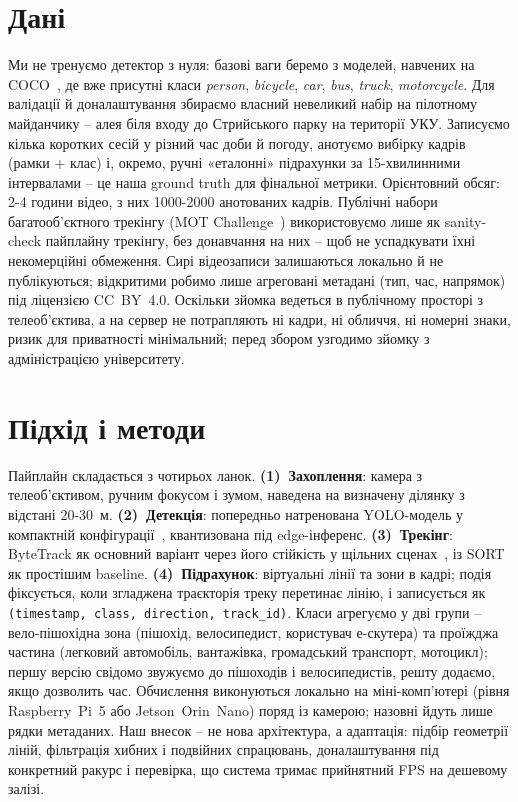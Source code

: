 \documentclass[ukrainian]{ucuproposal}
\begin{document}
\section{Дані}
Ми не тренуємо детектор з нуля: базові ваги беремо з моделей, навчених на COCO~\cite{lin2014}, де
вже присутні класи \emph{person}, \emph{bicycle}, \emph{car}, \emph{bus},
\emph{truck}, \emph{motorcycle}. Для валідації й доналаштування збираємо власний
невеликий набір на пілотному майданчику – алея біля входу до Стрийського парку на
території УКУ. Записуємо кілька коротких сесій у різний час доби й погоду, анотуємо
вибірку кадрів (рамки + клас) і, окремо, ручні «еталонні» підрахунки за
15-хвилинними інтервалами – це наша ground truth для фінальної метрики. Орієнтовний
обсяг: 2-4 години відео, з них 1000-2000 анотованих кадрів. Публічні набори
багатооб'єктного трекінгу (MOT Challenge~\cite{milan2016}) використовуємо лише як
sanity-check пайплайну трекінгу, без донавчання на них – щоб не успадкувати їхні
некомерційні обмеження. Сирі відеозаписи
залишаються локально й не публікуються; відкритими робимо лише агреговані метадані
(тип, час, напрямок) під ліцензією CC~BY~4.0. Оскільки зйомка ведеться в публічному
просторі з телеоб'єктива, а на сервер не потрапляють ні кадри, ні обличчя, ні
номерні знаки, ризик для приватності мінімальний; перед збором узгодимо зйомку з
адміністрацією університету.
\section{Підхід і методи}
Пайплайн складається з чотирьох ланок. \textbf{(1)~Захоплення}: камера з
телеоб'єктивом, ручним фокусом і зумом, наведена на визначену ділянку з відстані
20-30~м. \textbf{(2)~Детекція}: попередньо натренована YOLO-модель у компактній
конфігурації~\cite{jocher2023}, квантизована під edge-інференс.
\textbf{(3)~Трекінг}: ByteTrack як основний варіант через його стійкість у щільних
сценах~\cite{zhang2022}, із SORT~\cite{bewley2016} як простішим baseline.
\textbf{(4)~Підрахунок}: віртуальні лінії та зони в кадрі; подія фіксується, коли
згладжена траєкторія треку перетинає лінію, і записується як
\texttt{(timestamp, class, direction, track\_id)}. Класи агрегуємо у дві групи –
вело-пішохідна зона (пішохід, велосипедист, користувач е-скутера) та проїжджа
частина (легковий автомобіль, вантажівка, громадський транспорт, мотоцикл); першу
версію свідомо звужуємо до пішоходів і велосипедистів, решту додаємо, якщо дозволить
час. Обчислення виконуються локально на міні-комп'ютері (рівня Raspberry~Pi~5 або
Jetson~Orin~Nano) поряд із камерою; назовні йдуть лише рядки метаданих. Наш внесок –
не нова архітектура, а адаптація: підбір геометрії ліній, фільтрація хибних і
подвійних спрацювань, доналаштування під конкретний ракурс і перевірка, що система
тримає прийнятний FPS на дешевому залізі.
\end{document}
